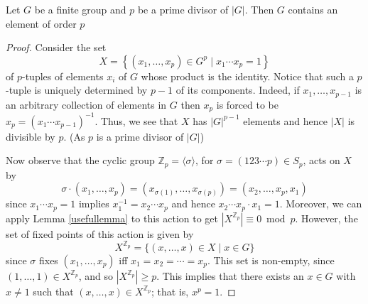 \begin{theorem}
  Let $G$ be a finite group and $p$ be a prime divisor of $|G|$. Then $G$ contains an
  element of order $p$
  \label{thm:cauchy}
\end{theorem}
\begin{proof}
    Consider the set
    $$
    X=\left\{\left(x_1, \ldots, x_p\right) \in G^p \mid x_1 \cdots x_p=1\right\}
    $$
    of $p$-tuples of elements $x_i$ of $G$ whose product is the identity. Notice that such a $p$-tuple is uniquely determined by $p-1$ of its components. Indeed, if $x_1, \ldots, x_{p-1}$ is an arbitrary collection of elements in $G$ then $x_p$ is forced to be $x_p=\left(x_1 \cdots x_{p-1}\right)^{-1}$. Thus, we see that $X$ has $|G|^{p-1}$ elements and hence $|X|$ is divisible by $p$. (As $p$ is a prime divisor of $|G|$)
    
    Now observe that the cyclic group $\mathbb{Z}_p=\langle\sigma\rangle$, for $\sigma=(123 \cdots p) \in S_p$, acts on $X$ by
    $$
    \sigma \cdot\left(x_1, \ldots, x_p\right)=\left(x_{\sigma(1)}, \ldots, x_{\sigma(p)}\right)=\left(x_2, \ldots, x_p, x_1\right)
    $$
    since $x_1 \cdots x_p=1$ implies $x_1^{-1}=x_2 \cdots x_p$ and hence $x_2 \cdots x_p \cdot x_1=1$. Moreover, we can apply Lemma \ref{usefullemma} to this action to get $\left|X^{\mathbb{Z}_p}\right| \equiv 0 \bmod p$. However, the set of fixed points of this action is given by
    $$
    X^{\mathbb{Z}_p}=\{(x, \ldots, x) \in X \mid x \in G\}
    $$
    since $\sigma$ fixes $\left(x_1, \ldots, x_p\right)$ iff $x_1=x_2=\cdots=x_p$. This set is non-empty, since $(1, \ldots, 1) \in X^{\mathbb{Z}_p}$, and so $\left|X^{\mathbb{Z}_p}\right| \geq p$. This implies that there exists an $x \in G$ with $x \neq 1$ such that $(x, \ldots, x) \in X^{\mathbb{Z}_p}$; that is, $x^p=1$.



\end{proof}
